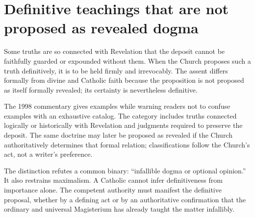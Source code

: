 \section{Definitive teachings that are not proposed as revealed dogma}

Some truths are so connected with Revelation that the deposit cannot be
faithfully guarded or expounded without them. When the Church proposes such a
truth definitively, it is to be held firmly and irrevocably. The assent differs
formally from divine and Catholic faith because the proposition is not proposed
as itself formally revealed; its certainty is nevertheless definitive.

The 1998 commentary gives examples while warning readers not to confuse
examples with an exhaustive catalog. The category includes truths connected
logically or historically with Revelation and judgments required to preserve
the deposit. The same doctrine may later be proposed as revealed if the Church
authoritatively determines that formal relation; classifications follow the
Church's act, not a writer's preference.

The distinction refutes a common binary: ``infallible dogma or optional
opinion.'' It also restrains maximalism. A Catholic cannot infer definitiveness
from importance alone. The competent authority must manifest the definitive
proposal, whether by a defining act or by an authoritative confirmation that
the ordinary and universal Magisterium has already taught the matter
infallibly.

